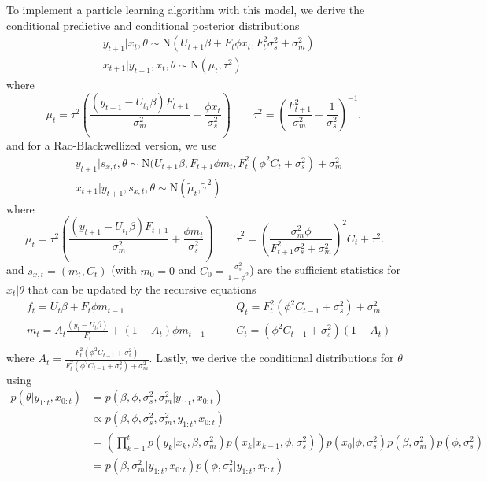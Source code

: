 \documentclass{article}
\begin{document}
To implement a particle learning algorithm with this model, we derive the conditional predictive and conditional posterior distributions
\begin{align*}
&y_{t+1}|x_t,\theta \sim \mbox{N}(U_{t+1}\beta + F_t\phi x_t, F_t^2\sigma^2_s + \sigma^2_m) \\
&x_{t+1}|y_{t+1},x_t,\theta \sim \mbox{N}(\mu_t,\tau^2)
\end{align*}
where \[\mu_t = \tau^2\left(\frac{(y_{t+1}-U_{t_1}\beta)F_{t+1}}{\sigma^2_m} + \frac{\phi x_t}{\sigma^2_s}\right) \qquad \tau^2 = \left(\frac{F_{t+1}^2}{\sigma^2_m} + \frac{1}{\sigma^2_s}\right)^{-1},\] and for a Rao-Blackwellized version, we use
\begin{align*}
&y_{t+1}|s_{x,t},\theta \sim \mbox{N}(U_{t+1}\beta,F_{t+1}\phi m_t, F_t^2(\phi^2 C_t + \sigma^2_s) + \sigma^2_m \\
&x_{t+1}|y_{t+1},s_{x,t},\theta \sim \mbox{N}(\tilde{\mu}_t,\tilde{\tau}^2)
\end{align*}
where \[\tilde{\mu}_t = \tau^2\left(\frac{(y_{t+1}-U_{t_1}\beta)F_{t+1}}{\sigma^2_m} + \frac{\phi m_t}{\sigma^2_s}\right) \qquad \tilde{\tau}^2 = \left(\frac{\sigma^2_m\phi}{F_{t+1}^2\sigma^2_s + \sigma^2_m}\right)^2C_t + \tau^2.\]
and $s_{x,t} = (m_t,C_t)$ (with $m_0 = 0$ and $C_0 = \frac{\sigma^2_s}{1-\phi^2}$) are the sufficient statistics for $x_t|\theta$ that can be updated by the recursive equations
\begin{align*}
&f_t = U_t\beta + F_t\phi m_{t-1} \qquad &Q_t = F_t^2(\phi^2C_{t-1} + \sigma^2_s) + \sigma^2_m \\
&m_t = A_t\frac{(y_t - U_t\beta)}{F_t} + (1 - A_t)\phi m_{t-1} \qquad &C_t = (\phi^2C_{t-1} + \sigma^2_s)(1 - A_t) \\
\end{align*}
where $A_t = \frac{F_t^2(\phi^2C_{t-1} + \sigma^2_s)}{F_t^2(\phi^2C_{t-1} + \sigma^2_s) + \sigma^2_m}$. Lastly, we derive the conditional distributions for $\theta$ using
\begin{align*}
p(\theta|y_{1:t},x_{0:t}) &= p(\beta,\phi,\sigma^2_s,\sigma^2_m|y_{1:t},x_{0:t}) \\
&\propto p(\beta,\phi,\sigma^2_s,\sigma^2_m,y_{1:t},x_{0:t}) \\
&= \left(\prod_{k=1}^t p(y_k|x_k,\beta,\sigma^2_m)p(x_k|x_{k-1},\phi,\sigma^2_s)\right)p(x_0|\phi,\sigma^2_s)p(\beta,\sigma^2_m)p(\phi,\sigma^2_s) \\
&= p(\beta,\sigma^2_m|y_{1:t},x_{0:t})p(\phi,\sigma^2_s|y_{1:t},x_{0:t})
\end{align*}
\end{document}
